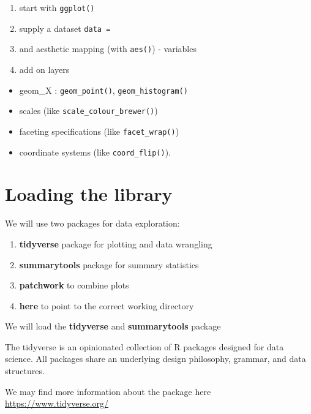 \documentclass[
  10pt,
]{krantz}
\providecommand{\tightlist}{%
  \setlength{\itemsep}{0pt}\setlength{\parskip}{0pt}}
\begin{document}
\begin{enumerate}
\def\labelenumi{\arabic{enumi}.}
\tightlist
\item
  start with \texttt{ggplot()}
\item
  supply a dataset \texttt{data\ =}
\item
  and aesthetic mapping (with \texttt{aes()}) - variables
\item
  add on layers
\end{enumerate}

\begin{itemize}
\tightlist
\item
  geom\_X : \texttt{geom\_point()}, \texttt{geom\_histogram()}
\item
  scales (like \texttt{scale\_colour\_brewer()})
\item
  faceting specifications (like \texttt{facet\_wrap()})
\item
  coordinate systems (like \texttt{coord\_flip()}).
\end{itemize}

\hypertarget{loading-the-library}{%
\section{Loading the library}\label{loading-the-library}}

We will use two packages for data exploration:

\begin{enumerate}
\def\labelenumi{\arabic{enumi}.}
\tightlist
\item
  \textbf{tidyverse} package for plotting and data wrangling
\item
  \textbf{summarytools} package for summary statistics
\item
  \textbf{patchwork} to combine plots
\item
  \textbf{here} to point to the correct working directory
\end{enumerate}

We will load the \textbf{tidyverse} and \textbf{summarytools} package

The tidyverse is an opinionated collection of R packages designed for data science. All packages share an underlying design philosophy, grammar, and data structures.

We may find more information about the package here \url{https://www.tidyverse.org/}
\end{document}
